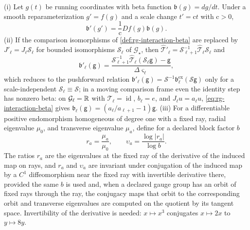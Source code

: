 (i) Let \(g(t)\) be running coordinates with beta function
\(\mathfrak b(g)=dg/dt\). Under a smooth reparameterization \(g'=f(g)\) and a
scale change \(t'=\mathrm ct\) with \(\mathrm c>0\),
\begin{equation}
\mathfrak b'(g')=\frac1{\mathrm c}Df(g)\mathfrak b(g).
\label{eq:rg-beta-change}
\end{equation}
(ii) If the comparison isomorphisms of \cref{def:rg-interaction-beta} are
replaced by \(J'_\ell=J_\ell\mathcal S_\ell\) for bounded isomorphisms
\(\mathcal S_\ell\) of \(\mathcal G_\star\), then
\(\widehat{\mathcal T}'_\ell=\mathcal S_{\ell+1}^{-1}\widehat{\mathcal T}_\ell\mathcal S_\ell\)
and
\begin{equation}
\mathfrak b'_\ell(\mathsf g)
=\frac{\mathcal S_{\ell+1}^{-1}\widehat{\mathcal T}_\ell(\mathcal S_\ell\mathsf g)-\mathsf g}
{\Delta\varsigma_\ell},
\label{eq:rg-interaction-beta-scheme-change}
\end{equation}
which reduces to the pushforward relation
\(\mathfrak b'_\ell(\mathsf g)=\mathcal S^{-1}\mathfrak b^{\mathrm{ex}}_\ell(\mathcal S\mathsf g)\)
only for a scale-independent \(\mathcal S_\ell\equiv\mathcal S\); in a moving
comparison frame even the identity step has nonzero beta: on
\(\mathcal G_\ell=\mathbb R\) with \(\mathcal T_\ell=\operatorname{id}\), \(b_\ell=e\), and
\(J_\ell u=a_\ell u\), \eqref{eq:rg-interaction-beta} gives
\(\mathfrak b_\ell(\mathsf g)=(a_\ell/a_{\ell+1}-1)\mathsf g\). (iii) For a differentiable
positive endomorphism homogeneous of degree one with a fixed ray, radial
eigenvalue \(\mu_0\), and transverse eigenvalue \(\mu_a\), define for a
declared block factor \(b\)
\begin{equation}
r_a=\frac{\mu_a}{\mu_0},\qquad
\upsilon_a=\frac{\log\lvert r_a\rvert}{\log b}.
\label{eq:rg-projective-dimensions}
\end{equation}
The ratios \(r_a\) are the eigenvalues at the fixed ray of the derivative of
the induced map on rays, and \(r_a\) and \(\upsilon_a\) are invariant under
conjugation of the induced map by a \(C^1\) diffeomorphism near the fixed ray
with invertible derivative there, provided the same \(b\) is used and, when a
declared gauge group has an orbit of fixed rays through the ray, the conjugacy
maps that orbit to the corresponding orbit and transverse eigenvalues are
computed on the quotient by its tangent space. Invertibility of the derivative
is needed: \(x\mapsto x^3\) conjugates \(x\mapsto2x\) to \(y\mapsto8y\).

